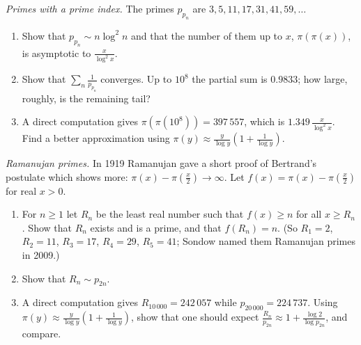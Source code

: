 \begin{exercise}[$\star$]\label{pb:superprimes}
\emph{Primes with a prime index.} The primes $p_{p_n}$ are $3,5,11,17,31,41,59,\dots$
\begin{enumerate}[label=(\alph*)]
\item Show that $p_{p_n}\sim n\log^2n$ and that the number of them up to $x$, $\pi(\pi(x))$, is asymptotic to $\frac x{\log^2x}$.
\item Show that $\sum_n\frac1{p_{p_n}}$ converges. Up to $10^8$ the partial sum is $0.9833$; how large, roughly, is the remaining tail?
\item A direct computation gives $\pi(\pi(10^8))=397\,557$, which is $1.349\,\frac x{\log^2x}$. Find a better approximation using $\pi(y)\approx\frac y{\log y}(1+\frac1{\log y})$.
\end{enumerate}
\end{exercise}

\begin{exercise}[$\star\star$]\label{pb:ramprimes}
\emph{Ramanujan primes.} In 1919 Ramanujan gave a short proof of Bertrand's postulate which shows more: $\pi(x)-\pi(\frac x2)\to\infty$. Let $f(x)=\pi(x)-\pi(\frac x2)$ for real $x>0$.
\begin{enumerate}[label=(\alph*)]
\item For $n\ge1$ let $R_n$ be the least real number such that $f(x)\ge n$ for all $x\ge R_n$. Show that $R_n$ exists and is a prime, and that $f(R_n)=n$.
(So $R_1=2$, $R_2=11$, $R_3=17$, $R_4=29$, $R_5=41$; Sondow named them Ramanujan primes in 2009.)
\item Show that $R_n\sim p_{2n}$.
\item A direct computation gives $R_{10\,000}=242\,057$ while $p_{20\,000}=224\,737$. Using $\pi(y)\approx\frac y{\log y}(1+\frac1{\log y})$, show that one should expect
$\frac{R_n}{p_{2n}}\approx1+\frac{\log2}{\log p_{2n}}$, and compare.
\end{enumerate}
\end{exercise}

